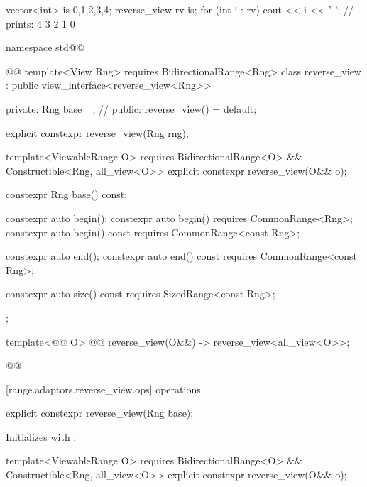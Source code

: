 {\pnum
\begin{example}
\begin{codeblock}
vector<int> is {0,1,2,3,4};
reverse_view rv {is};
for (int i : rv)
  cout << i << ' '; // prints: 4 3 2 1 0
\end{codeblock}
\end{example}

\begin{codeblock}
namespace std@@ { @@
  template<View Rng>
    requires BidirectionalRange<Rng>
  class reverse_view : public view_interface<reverse_view<Rng>> {
  private:
    Rng base_ {}; // \expos
  public:
    reverse_view() = default;

    explicit constexpr reverse_view(Rng rng);

    template<ViewableRange O>
      requires BidirectionalRange<O> && Constructible<Rng, all_view<O>>
    explicit constexpr reverse_view(O&& o);

    constexpr Rng base() const;

    constexpr auto begin();
    constexpr auto begin() requires CommonRange<Rng>;
    constexpr auto begin() const requires CommonRange<const Rng>;

    constexpr auto end();
    constexpr auto end() const requires CommonRange<const Rng>;

    constexpr auto size() const requires SizedRange<const Rng>;
  };

  template<@@ O>
    @@
  reverse_view(O&&) -> reverse_view<all_view<O>>;
}@\oldtxt{\}}@
\end{codeblock}

[range.adaptors.reverse_view.ops]{ operations}

%
\begin{itemdecl}
explicit constexpr reverse_view(Rng base);
\end{itemdecl}

\begin{itemdescr}
\pnum
\effects Initializes  with .
\end{itemdescr}

%
\begin{itemdecl}
template<ViewableRange O>
  requires BidirectionalRange<O> && Constructible<Rng, all_view<O>>
explicit constexpr reverse_view(O&& o);
\end{itemdecl}

}
